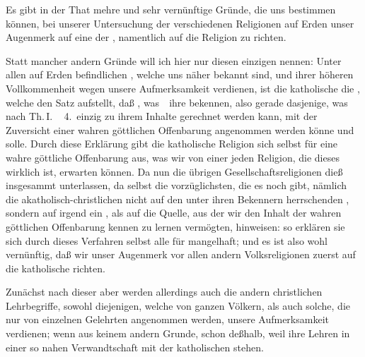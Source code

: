 \begin{aufza}
\item Es gibt in der That mehre und sehr vernünftige Gründe, die uns bestimmen können, bei unserer Untersuchung der verschiedenen Religionen auf Erden unser Augenmerk  auf eine der , namentlich auf die  Religion zu richten. 
\item Statt mancher andern Gründe will ich hier nur diesen einzigen nennen: Unter allen auf Erden befindlichen , welche uns näher bekannt sind, und ihrer höheren Vollkommenheit wegen unsere Aufmerksamkeit verdienen, ist die katholische die , welche den Satz aufstellt, daß , was~\ ihre  bekennen, also gerade dasjenige, was nach Th.\,I.\ \ \no\,4.\ einzig zu ihrem Inhalte gerechnet werden kann, mit der Zuversicht einer wahren göttlichen Offenbarung angenommen werden könne und solle. Durch diese Erklärung gibt die katholische Religion sich selbst für eine wahre göttliche Offenbarung aus, was wir von einer jeden Religion, die dieses wirklich ist, erwarten können. Da nun die übrigen Gesellschaftsreligionen dieß insgesammt unterlassen, da selbst die vorzüglichsten, die es noch gibt, nämlich die akatholisch-christlichen nicht auf den  unter ihren Bekennern herrschenden , sondern auf irgend ein , als auf die  Quelle, aus der wir den Inhalt der wahren göttlichen Offenbarung kennen zu lernen vermögten, hinweisen: so erklären sie sich durch dieses Verfahren selbst alle für mangelhaft; und es ist also wohl vernünftig, daß wir unser Augenmerk vor allen andern Volksreligionen zuerst auf die katholische richten.
\item Zunächst nach dieser aber werden allerdings auch die andern christlichen Lehrbegriffe, sowohl diejenigen, welche von ganzen Völkern, als auch solche, die nur von einzelnen Gelehrten angenommen werden, unsere Aufmerksamkeit verdienen; wenn aus keinem andern Grunde, schon deßhalb, weil ihre Lehren in einer so nahen Verwandtschaft mit der katholischen stehen.
\end{aufza}

